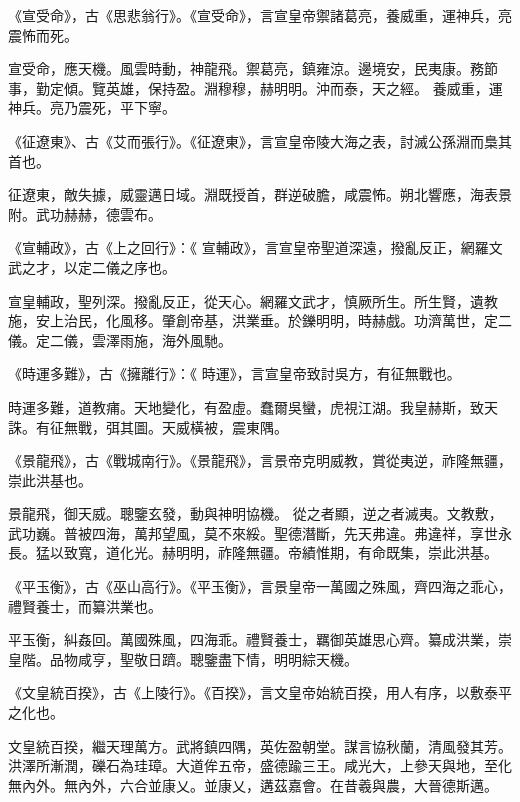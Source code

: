 \begin{pinyinscope}
 《宣受命》，古《思悲翁行》。《宣受命》，言宣皇帝禦諸葛亮，養威重，運神兵，亮震怖而死。



 宣受命，應天機。風雲時動，神龍飛。禦葛亮，鎮雍涼。邊境安，民夷康。務節事，勤定傾。覽英雄，保持盈。淵穆穆，赫明明。沖而泰，天之經。
 養威重，運神兵。亮乃震死，平下寧。



 《征遼東》、古《艾而張行》。《征遼東》，言宣皇帝陵大海之表，討滅公孫淵而梟其首也。



 征遼東，敵失據，威靈邁日域。淵既授首，群逆破膽，咸震怖。朔北響應，海表景附。武功赫赫，德雲布。



 《宣輔政》，古《上之回行》：《
 宣輔政》，言宣皇帝聖道深遠，撥亂反正，網羅文武之才，以定二儀之序也。



 宣皇輔政，聖列深。撥亂反正，從天心。網羅文武才，慎厥所生。所生賢，遺教施，安上治民，化風移。肇創帝基，洪業垂。於鑠明明，時赫戲。功濟萬世，定二儀。定二儀，雲澤雨施，海外風馳。



 《時運多難》，古《擁離行》：《
 時運》，言宣皇帝致討吳方，有征無戰也。



 時運多難，道教痡。天地變化，有盈虛。蠢爾吳蠻，虎視江湖。我皇赫斯，致天誅。有征無戰，弭其圖。天威橫被，震東隅。



 《景龍飛》，古《戰城南行》。《景龍飛》，言景帝克明威教，賞從夷逆，祚隆無疆，崇此洪基也。



 景龍飛，御天威。聰鑒玄發，動與神明協機。
 從之者顯，逆之者滅夷。文教敷，武功巍。普被四海，萬邦望風，莫不來綏。聖德潛斷，先天弗違。弗違祥，享世永長。猛以致寬，道化光。赫明明，祚隆無疆。帝績惟期，有命既集，崇此洪基。



 《平玉衡》，古《巫山高行》。《平玉衡》，言景皇帝一萬國之殊風，齊四海之乖心，禮賢養士，而纂洪業也。



 平玉衡，糾姦回。萬國殊風，四海乖。禮賢養士，羈御英雄思心齊。纂成洪業，崇皇階。品物咸亨，聖敬日躋。聰鑒盡下情，明明綜天機。



 《文皇統百揆》，古《上陵行》。《百揆》，言文皇帝始統百揆，用人有序，以敷泰平之化也。



 文皇統百揆，繼天理萬方。武將鎮四隅，英佐盈朝堂。謀言協秋蘭，清風發其芳。
 洪澤所漸潤，礫石為珪璋。大道侔五帝，盛德踰三王。咸光大，上參天與地，至化無內外。無內外，六合並康乂。並康乂，遘茲嘉會。在昔羲與農，大晉德斯邁。




\end{pinyinscope}
